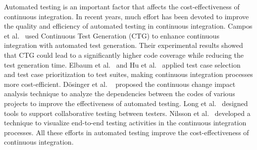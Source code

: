 
Automated testing is an important factor that affects the cost-effectiveness of continuous integration. In recent years, much effort has been devoted to improve the quality and efficiency of automated testing in continuous integration. Campos et al.~\cite{campos2014continuous} used Continuous Test Generation (CTG) to enhance continuous integration with automated test generation. Their experimental results showed that CTG could lead to a significantly higher code coverage while reducing the test generation time. Elbaum et al.~\cite{elbaum2014techniques} and Hu et al.~\cite{hu2016Implementation} applied test case selection and test case prioritization to test suites, making continuous integration processes more cost-efficient. D{\"o}singer et al. ~\cite{dosinger2012communicating} proposed the continuous change impact analysis technique to analyze the dependencies between the codes of various projects to improve the effectiveness of automated testing. Long et al.~\cite{long2015collaborative} designed tools to support collaborative testing between testers. Nilsson et al.~\cite{nilsson2014visualizing} developed a technique to visualize end-to-end testing activities in the continuous integration processes. All these efforts in automated testing improve the cost-effectiveness of continuous integration. 

 